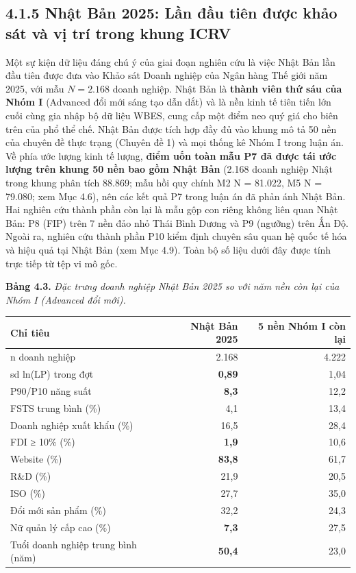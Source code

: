 \documentclass[
  a4paper,
  13pt]{extreport}
\begin{document}
\hypertarget{nhux1eadt-bux1ea3n-2025-lux1ea7n-ux111ux1ea7u-tiuxean-ux111ux1b0ux1ee3c-khux1ea3o-suxe1t-vuxe0-vux1ecb-truxed-trong-khung-icrv}{%
\subsection{4.1.5 Nhật Bản 2025: Lần đầu tiên được khảo sát và vị trí
trong khung
ICRV}\label{nhux1eadt-bux1ea3n-2025-lux1ea7n-ux111ux1ea7u-tiuxean-ux111ux1b0ux1ee3c-khux1ea3o-suxe1t-vuxe0-vux1ecb-truxed-trong-khung-icrv}}

Một sự kiện dữ liệu đáng chú ý của giai đoạn nghiên cứu là việc Nhật Bản
lần đầu tiên được đưa vào Khảo sát Doanh nghiệp của Ngân hàng Thế giới
năm 2025, với mẫu \(N = 2.168\) doanh nghiệp. Nhật Bản là \textbf{thành
viên thứ sáu của Nhóm I} (Advanced đổi mới sáng tạo dẫn dắt) và là nền
kinh tế tiên tiến lớn cuối cùng gia nhập bộ dữ liệu WBES, cung cấp một
điểm neo quý giá cho biên trên của phổ thể chế. Nhật Bản được tích hợp
đầy đủ vào khung mô tả 50 nền của chuyên đề thực trạng (Chuyên đề 1) và
mọi thống kê Nhóm I trong luận án. Về phía ước lượng kinh tế lượng,
\textbf{điểm uốn toàn mẫu P7 đã được tái ước lượng trên khung 50 nền bao
gồm Nhật Bản} (2.168 doanh nghiệp Nhật trong khung phân tích 88.869; mẫu
hồi quy chính M2 N = 81.022, M5 N = 79.080; xem Mục 4.6), nên các kết
quả P7 trong luận án đã phản ánh Nhật Bản. Hai nghiên cứu thành phần còn
lại là mẫu gộp con riêng không liên quan Nhật Bản: P8 (FIP) trên 7 nền
đảo nhỏ Thái Bình Dương và P9 (ngưỡng) trên Ấn Độ. Ngoài ra, nghiên cứu
thành phần P10 kiểm định chuyên sâu quan hệ quốc tế hóa và hiệu quả tại
Nhật Bản (xem Mục 4.9). Toàn bộ số liệu dưới đây được tính trực tiếp từ
tệp vi mô gốc.

\textbf{Bảng 4.3.} \emph{Đặc trưng doanh nghiệp Nhật Bản 2025 so với năm
nền còn lại của Nhóm I (Advanced đổi mới).}

\begin{longtable}[]{@{}lrr@{}}
\toprule\noalign{}
Chỉ tiêu & Nhật Bản 2025 & 5 nền Nhóm I còn lại \\
\midrule\noalign{}
\endhead
\bottomrule\noalign{}
\endlastfoot
n doanh nghiệp & 2.168 & 4.222 \\
sd ln(LP) trong đợt & \textbf{0,89} & 1,04 \\
P90/P10 năng suất & \textbf{8,3} & 12,2 \\
FSTS trung bình (\%) & 4,1 & 13,4 \\
Doanh nghiệp xuất khẩu (\%) & 16,5 & 28,4 \\
FDI ≥ 10\% (\%) & \textbf{1,9} & 10,6 \\
Website (\%) & \textbf{83,8} & 61,7 \\
R\&D (\%) & 21,9 & 20,5 \\
ISO (\%) & 27,7 & 35,0 \\
Đổi mới sản phẩm (\%) & 32,2 & 24,3 \\
Nữ quản lý cấp cao (\%) & \textbf{7,3} & 27,5 \\
Tuổi doanh nghiệp trung bình (năm) & \textbf{50,4} & 23,0 \\
\end{longtable}
\end{document}
